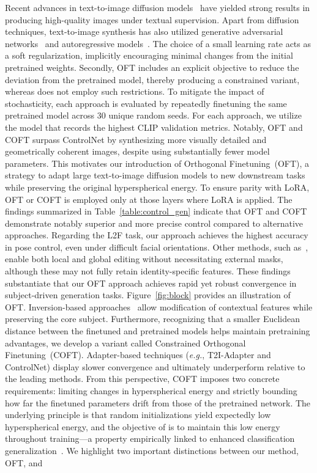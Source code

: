 Recent advances in text-to-image diffusion models~\cite{saharia2022photorealistic,ramesh2022hierarchical,rombach2022high} have yielded strong results in producing high-quality images under textual supervision. Apart from diffusion techniques, text-to-image synthesis has also utilized generative adversarial networks~\cite{reed2016generative,zhang2017stackgan,xu2018attngan,li2019controllable} and autoregressive models~\cite{ramesh2021zero,ding2021cogview,wu2022nuwa,yuscaling}. The choice of a small learning rate acts as a soft regularization, implicitly encouraging minimal changes from the initial pretrained weights. Secondly, OFT includes an explicit objective to reduce the deviation from the pretrained model, thereby producing a constrained variant, whereas \cite{liu2021orthogonal} does not employ such restrictions. To mitigate the impact of stochasticity, each approach is evaluated by repeatedly finetuning the same pretrained model across 30 unique random seeds. For each approach, we utilize the model that records the highest CLIP validation metrics. Notably, OFT and COFT surpass ControlNet by synthesizing more visually detailed and geometrically coherent images, despite using substantially fewer model parameters. This motivates our introduction of Orthogonal Finetuning~(OFT), a strategy to adapt large text-to-image diffusion models to new downstream tasks while preserving the original hyperspherical energy. To ensure parity with LoRA, OFT or COFT is employed only at those layers where LoRA is applied. The findings summarized in Table~\ref{table:control_gen} indicate that OFT and COFT demonstrate notably superior and more precise control compared to alternative approaches. Regarding the L2F task, our approach achieves the highest accuracy in pose control, even under difficult facial orientations. Other methods, such as~\cite{hertz2022prompt}, enable both local and global editing without necessitating external masks, although these may not fully retain identity-specific features. These findings substantiate that our OFT approach achieves rapid yet robust convergence in subject-driven generation tasks. Figure~\ref{fig:block} provides an illustration of OFT. Inversion-based approaches~\cite{choi2021ilvr,dhariwal2021diffusion,ramesh2022hierarchical,gal2022image} allow modification of contextual features while preserving the core subject. Furthermore, recognizing that a smaller Euclidean distance between the finetuned and pretrained models helps maintain pretraining advantages, we develop a variant called Constrained Orthogonal Finetuning~(COFT). Adapter-based techniques (\emph{e.g.}, T2I-Adapter and ControlNet) display slower convergence and ultimately underperform relative to the leading methods. From this perspective, COFT imposes two concrete requirements: limiting changes in hyperspherical energy and strictly bounding how far the finetuned parameters drift from those of the pretrained network. The underlying principle is that random initializations yield expectedly low hyperspherical energy, and the objective of \cite{liu2021orthogonal} is to maintain this low energy throughout training—a property empirically linked to enhanced classification generalization~\cite{liu2018learning,lin2020regularizing}. We highlight two important distinctions between our method, OFT, and 